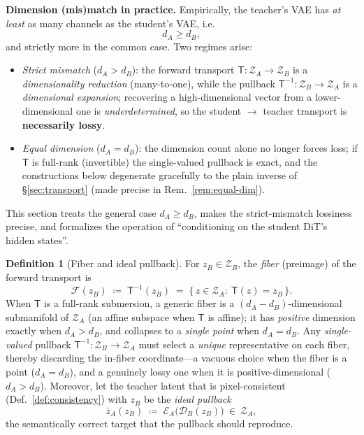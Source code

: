 \documentclass[11pt,a4paper]{article}
\newcommand{\Za}{\mathcal{Z}_{A}}
\newcommand{\Zb}{\mathcal{Z}_{B}}
\newcommand{\Enc}{\mathcal{E}}
\newcommand{\Dec}{\mathcal{D}}
\newcommand{\Tmap}{\mathsf{T}}
\newcommand{\Tinv}{\mathsf{T}^{-1}}
\theoremstyle{definition}
\newtheorem{definition}{Definition}
\begin{document}
\textbf{Dimension (mis)match in practice.}
Empirically, the teacher's VAE has \emph{at least} as many channels as the student's VAE, i.e.
\[
d_A \ge d_B ,
\]
and strictly more in the common case. Two regimes arise:
\begin{itemize}[leftmargin=1.6em,itemsep=2pt]
  \item \emph{Strict mismatch} ($d_A>d_B$): the forward transport $\Tmap:\Za\to\Zb$ is a
        \emph{dimensionality reduction} (many-to-one), while the pullback $\Tinv:\Zb\to\Za$ is a
        \emph{dimensional expansion}; recovering a high-dimensional vector from a lower-dimensional
        one is \emph{underdetermined}, so the student $\to$ teacher transport is
        \textbf{necessarily lossy}.
  \item \emph{Equal dimension} ($d_A=d_B$): the dimension count alone no longer forces loss; if
        $\Tmap$ is full-rank (invertible) the single-valued pullback is exact, and the
        constructions below degenerate gracefully to the plain inverse of \S\ref{sec:transport}
        (made precise in Rem.~\ref{rem:equal-dim}).
\end{itemize}
This section treats the general case $d_A\ge d_B$, makes the strict-mismatch lossiness precise, and
formalizes the operation of ``conditioning on the student DiT's hidden states''.

\begin{definition}[Fiber and ideal pullback]
\label{def:fiber}
For $z_B\in\Zb$, the \emph{fiber} (preimage) of the forward transport is
\[
\mathcal{F}(z_B)\;\coloneqq\;\Tmap^{-1}(z_B)\;=\;\{\,z\in\Za:\ \Tmap(z)=z_B\,\}.
\]
When $\Tmap$ is a full-rank submersion, a generic fiber is a $(d_A-d_B)$-dimensional submanifold of
$\Za$ (an affine subspace when $\Tmap$ is affine); it has \emph{positive} dimension exactly when
$d_A>d_B$, and collapses to a \emph{single point} when $d_A=d_B$. Any \emph{single-valued} pullback
$\Tinv:\Zb\to\Za$ must select a \emph{unique} representative on each fiber, thereby discarding the
in-fiber coordinate---a vacuous choice when the fiber is a point ($d_A=d_B$), and a genuinely lossy
one when it is positive-dimensional ($d_A>d_B$). Moreover, let the teacher latent that is
pixel-consistent
(Def.~\ref{def:consistency}) with $z_B$ be the \emph{ideal pullback}
\begin{equation}
\bar z_A(z_B)\;\coloneqq\;\Enc_A\big(\Dec_B(z_B)\big)\ \in\ \Za,
\label{eq:ideal-lift}
\end{equation}
the semantically correct target that the pullback should reproduce.
\end{definition}
\end{document}
